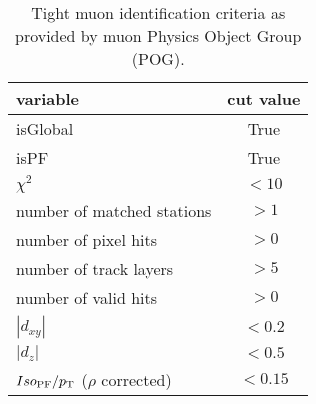 \begin{table}[ht]
    \centering
    \setlength{\tabcolsep}{2em}
    \renewcommand{\arraystretch}{1.1}
    \caption{Tight muon identification criteria as provided by muon Physics Object Group (POG). }
    \label{tab:analysis:selection:muon_id}
    \begin{tabular}{l|c}
    \hline
    variable                            & cut value \\
    \hline
    isGlobal                            & True      \\
    isPF                                & True      \\
    $\chi^{2}$                          & $< 10$    \\
    number of matched stations          & $> 1$     \\
    number of pixel hits                & $> 0$     \\
    number of track layers              & $> 5$     \\
    number of valid hits                & $> 0$     \\
    $|d_{xy}|$                          & $< 0.2$   \\
    $|d_{z}|$                           & $< 0.5$    \\
    \hline
    $Iso_\mathrm{PF}/p_{\mathrm{T}}$ ($\rho$ corrected) & $< 0.15$ \\
    \hline
    \end{tabular}
\end{table}
